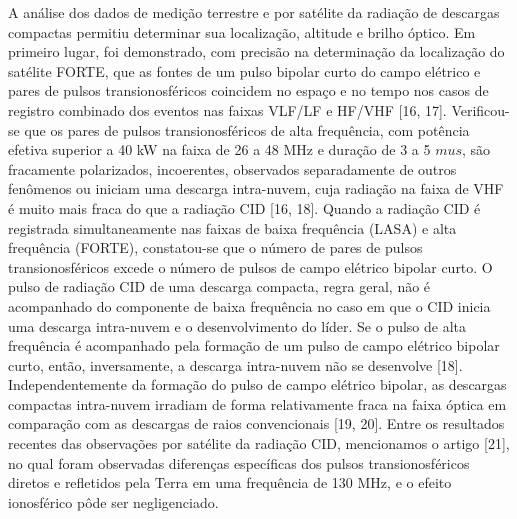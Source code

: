 \documentclass[a4paper, 12pt, onecolumn,singlespacing]{article}
\begin{document}
	A análise dos dados de medição terrestre e por satélite da radiação de descargas compactas permitiu determinar sua localização, altitude e brilho óptico. Em primeiro lugar, foi demonstrado, com precisão na determinação da localização do satélite FORTE, que as fontes de um pulso bipolar curto do campo elétrico e pares de pulsos transionosféricos coincidem no espaço e no tempo nos casos de registro combinado dos eventos nas faixas VLF/LF e HF/VHF [16, 17]. Verificou-se que os pares de pulsos transionosféricos de alta frequência, com potência efetiva superior a 40 kW na faixa de 26 a 48 MHz e duração de 3 a 5 $mu s$, são fracamente polarizados, incoerentes, observados separadamente de outros fenômenos ou iniciam uma descarga intra-nuvem, cuja radiação na faixa de VHF é muito mais fraca do que a radiação CID [16, 18]. Quando a radiação CID é registrada simultaneamente nas faixas de baixa frequência (LASA) e alta frequência (FORTE), constatou-se que o número de pares de pulsos transionosféricos excede o número de pulsos de campo elétrico bipolar curto. O pulso de radiação CID de uma descarga compacta, regra geral, não é acompanhado do componente de baixa frequência no caso em que o CID inicia uma descarga intra-nuvem e o desenvolvimento do líder. Se o pulso de alta frequência é acompanhado pela formação de um pulso de campo elétrico bipolar curto, então, inversamente, a descarga intra-nuvem não se desenvolve [18]. Independentemente da formação do pulso de campo elétrico bipolar, as descargas compactas intra-nuvem irradiam de forma relativamente fraca na faixa óptica em comparação com as descargas de raios convencionais [19, 20]. Entre os resultados recentes das observações por satélite da radiação CID, mencionamos o artigo [21], no qual foram observadas diferenças específicas dos pulsos transionosféricos diretos e refletidos pela Terra em uma frequência de 130 MHz, e o efeito ionosférico pôde ser negligenciado.
	
\end{document}
